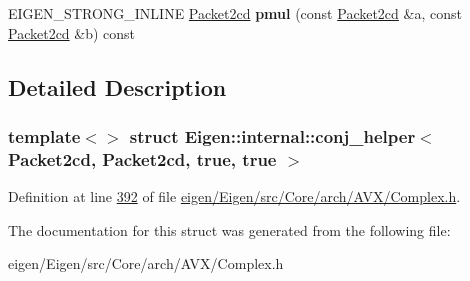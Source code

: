 \begin{DoxyCompactItemize}
\item 
\mbox{\label{struct_eigen_1_1internal_1_1conj__helper_3_01_packet2cd_00_01_packet2cd_00_01true_00_01true_01_4_a9fff571edb209bb981023c4a117baf00}} 
E\+I\+G\+E\+N\+\_\+\+S\+T\+R\+O\+N\+G\+\_\+\+I\+N\+L\+I\+NE \hyperlink{struct_eigen_1_1internal_1_1_packet2cd}{Packet2cd} {\bfseries pmul} (const \hyperlink{struct_eigen_1_1internal_1_1_packet2cd}{Packet2cd} \&a, const \hyperlink{struct_eigen_1_1internal_1_1_packet2cd}{Packet2cd} \&b) const
\end{DoxyCompactItemize}


\subsection{Detailed Description}
\subsubsection*{template$<$$>$\newline
struct Eigen\+::internal\+::conj\+\_\+helper$<$ Packet2cd, Packet2cd, true, true $>$}



Definition at line \hyperlink{eigen_2_eigen_2src_2_core_2arch_2_a_v_x_2_complex_8h_source_l00392}{392} of file \hyperlink{eigen_2_eigen_2src_2_core_2arch_2_a_v_x_2_complex_8h_source}{eigen/\+Eigen/src/\+Core/arch/\+A\+V\+X/\+Complex.\+h}.



The documentation for this struct was generated from the following file\+:\begin{DoxyCompactItemize}
\item 
eigen/\+Eigen/src/\+Core/arch/\+A\+V\+X/\+Complex.\+h\end{DoxyCompactItemize}
